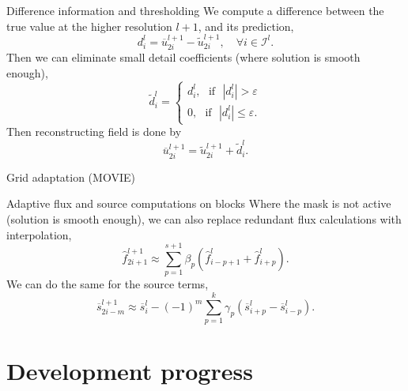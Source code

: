 \documentclass{beamer}
\begin{document}
\begin{frame}{Difference information and thresholding}
    We compute a difference between the true value at the higher resolution
    $l+1$, and its prediction,
    \begin{equation}
        d^{l}_{i} = \overline{u}^{l+1}_{2i} - \tilde{u}^{l+1}_{2i}, \quad \forall i \in \bm{\mathcal{I}}^{l}.
    \end{equation}
    Then we can eliminate small detail coefficients (where solution is smooth
    enough),
    \begin{equation}
        \tilde{d}^{l}_{i} =
            \begin{cases}
                d^{l}_{i}, \text{ } \text{if} \text{ } |d^{l}_{i}| > \varepsilon \\
                0, \text{ } \text{if} \text{ } |d^{l}_{i}| \leq
                \varepsilon.
            \end{cases}
    \end{equation}
    Then reconstructing field is done by
    \begin{equation*}
        \overline{u}^{l+1}_{2i} = \tilde{u}^{l+1}_{2i} + \tilde{d}^{l}_{i}.
    \end{equation*}
\end{frame}

\begin{frame}{Grid adaptation}
    (MOVIE)
\end{frame}

\begin{frame}{Adaptive flux and source computations on blocks}
    Where the mask is not active (solution is smooth enough), we can also
    replace redundant flux calculations with interpolation,
    \begin{equation}
        \hat{f}_{2i+1}^{l+1} \approx \sum_{p=1}^{s+1} \beta_{p} \left(
        \hat{f}^{l}_{i-p+1} + \hat{f}^{l}_{i+p} \right).
    \end{equation}
    We can do the same for the source terms,
    \begin{equation}
        \overline{s}_{2i-m}^{l+1} \approx \overline{s}_{i}^{l} - (-1)^{m} \sum_{p=1}^{k} \gamma_{p} \left(
            \overline{s}^{l}_{i+p} - \overline{s}^{l}_{i-p} \right).
    \end{equation}
\end{frame}

\section{Development progress}
\end{document}
